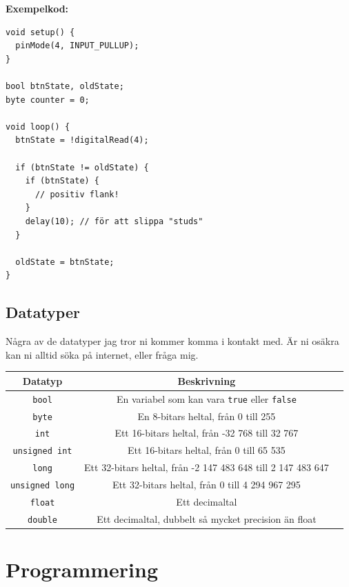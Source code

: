 \documentclass[11pt]{article}
\begin{document}
\newpage
\textbf{Exempelkod:}

\begin{lstlisting}
void setup() {
  pinMode(4, INPUT_PULLUP);
}

bool btnState, oldState;
byte counter = 0;

void loop() {
  btnState = !digitalRead(4);

  if (btnState != oldState) {
    if (btnState) {
      // positiv flank!
    }
    delay(10); // för att slippa "studs"
  }

  oldState = btnState;
}
\end{lstlisting}

\subsection{Datatyper}
Några av de datatyper jag tror ni kommer komma i kontakt med.
Är ni osäkra kan ni alltid söka på internet, eller fråga mig.

\begin{tabular}{|c|c|c|}
  \hline
  \textbf{Datatyp}       & \textbf{Beskrivning}                                         \\
  \hline
  \texttt{bool}          & En variabel som kan vara \texttt{true} eller \texttt{false}
  \\
  \hline
  \texttt{byte}          & En 8-bitars heltal, från 0 till 255                          \\
  \texttt{int}           & Ett 16-bitars heltal, från -32 768 till 32 767               \\
  \texttt{unsigned int}  & Ett 16-bitars heltal, från 0 till 65 535                     \\
  \texttt{long}          & Ett 32-bitars heltal, från -2 147 483 648 till 2 147 483 647
  \\
  \texttt{unsigned long} & Ett 32-bitars heltal, från 0 till 4 294 967 295              \\
  \hline
  \texttt{float}         & Ett decimaltal                                               \\
  \texttt{double}        & Ett decimaltal, dubbelt så mycket precision än float         \\
  \hline
\end{tabular}

\newpage
\section{Programmering}
\end{document}
